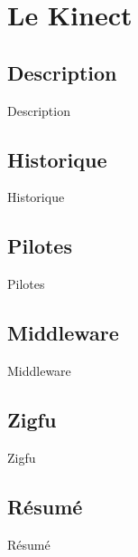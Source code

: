 \section{Le Kinect}

\subsection{Description}
\begin{frame}{Description}
\end{frame}

\subsection{Historique}
\begin{frame}{Historique}
\end{frame}

\subsection{Pilotes}
\begin{frame}{Pilotes}
\end{frame}

\subsection{Middleware}
\begin{frame}{Middleware}
\end{frame}

\subsection{Zigfu}
\begin{frame}{Zigfu}
\end{frame}

\subsection{Résumé}
\begin{frame}{Résumé}
\end{frame}